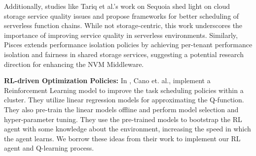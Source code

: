 Additionally, studies like Tariq et al.'s work on Sequoia \cite{tariq2020sequoia} shed light on cloud storage service quality issues and propose frameworks for better scheduling of serverless function chains. While not storage-centric, this work underscores the importance of improving service quality in serverless environments. Similarly, Pisces \cite{180275} extends performance isolation policies by achieving per-tenant performance isolation and fairness in shared storage services, suggesting a potential research direction for enhancing the NVM Middleware.

\textbf{RL-driven Optimization Policies:} In \cite{cano2017curator}, Cano et. al., implement a Reinforcement Learning model to improve the task scheduling policies within a cluster. They utilize linear regression models for approximating the Q-function. They also pre-train the linear models offline and perform model selection and hyper-parameter tuning. They use the pre-trained models to bootstrap the RL agent with some knowledge about the environment, increasing the speed in which the agent learns. We borrow these ideas from their work to implement our RL agent and Q-learning process. 





